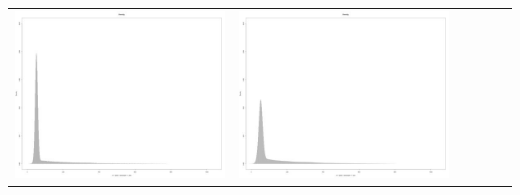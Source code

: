 \begin{table}[htbp]
{\begin{tabular}{l | ccccc}
\begin{minipage}{.085\textwidth}
     			 	\includegraphics[width=\linewidth]{images/mema-dens-graph/N3}
    				 \end{minipage}
    			   & \begin{minipage}{.085\textwidth}
     			 	\includegraphics[width=\linewidth]{images/mema-dens-graph/N7}
    				 \end{minipage}
    			   &	 \begin{minipage}{.085\textwidth}

\end{minipage}
\end{tabular}}
\end{table}
